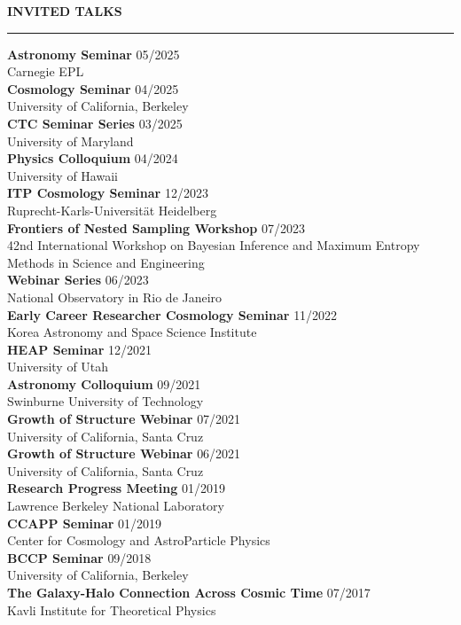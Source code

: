 \documentclass[12pt]{article}
\renewenvironment{section}[1]
  {
  \medskip
  {\color{aublue} \MakeUppercase{\bf #1}}
  \smallskip
  \hrule
  \medskip
  \begin{adjustwidth}{0.3cm}{}
  }
  {
  \end{adjustwidth}
  }
\newcommand{\entry}[3]{{\bf #1} \hfill {#2} \\ {#3}}
\begin{document}
\begin{section}{Invited Talks}
  \entry{Astronomy Seminar}{05/2025}{Carnegie EPL} \medskip \\
  \entry{Cosmology Seminar}{04/2025}{University of California, Berkeley} \medskip \\
  \entry{CTC Seminar Series}{03/2025}{University of Maryland} \medskip \\
  \entry{Physics Colloquium}{04/2024}{University of Hawaii} \medskip \\
  \entry{ITP Cosmology Seminar}{12/2023}{Ruprecht-Karls-Universität Heidelberg} \medskip \\
  \entry{Frontiers of Nested Sampling Workshop}{07/2023}{42nd  International Workshop on Bayesian Inference and Maximum Entropy Methods in Science and Engineering} \medskip \\
  \entry{Webinar Series}{06/2023}{National Observatory in Rio de Janeiro} \medskip \\
  \entry{Early Career Researcher Cosmology Seminar}{11/2022}{Korea Astronomy and Space Science Institute} \medskip \\
  \entry{HEAP Seminar}{12/2021}{University of Utah} \medskip \\
  \entry{Astronomy Colloquium}{09/2021}{Swinburne University of Technology} \medskip \\
  \entry{Growth of Structure Webinar}{07/2021}{University of California, Santa Cruz} \medskip \\
  \entry{Growth of Structure Webinar}{06/2021}{University of California, Santa Cruz} \medskip \\
  \entry{Research Progress Meeting}{01/2019}{Lawrence Berkeley National Laboratory} \medskip \\
  \entry{CCAPP Seminar}{01/2019}{Center for Cosmology and AstroParticle Physics} \medskip \\
  \entry{BCCP Seminar}{09/2018}{University of California, Berkeley} \medskip \\
  \entry{The Galaxy-Halo Connection Across Cosmic Time}{07/2017}{Kavli Institute for Theoretical Physics}
\end{section}
\end{document}
